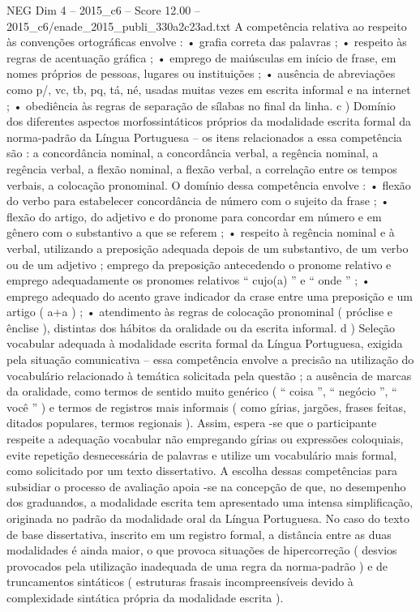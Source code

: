 \begin{textsample}{NEG Dim 4 – 2015\_c6 – Score 12.00 – 2015\_c6/enade\_2015\_publi\_330a2c23ad.txt}
A competência relativa ao respeito às convenções ortográficas envolve : • grafia correta das palavras ; • respeito às regras de acentuação gráfica ; • emprego de maiúsculas em início de frase, em nomes próprios de pessoas, lugares ou instituições ; • ausência de abreviações como p/, vc, tb, pq, tá, né, usadas muitas vezes em escrita informal e na internet ; • obediência às regras de separação de sílabas no final da linha. c ) Domínio dos diferentes aspectos morfossintáticos próprios da modalidade escrita formal da norma-padrão da Língua Portuguesa – os itens relacionados a essa competência são : a concordância nominal, a concordância verbal, a regência nominal, a regência verbal, a flexão nominal, a flexão verbal, a correlação entre os tempos verbais, a colocação pronominal.
O domínio dessa competência envolve : • flexão do verbo para estabelecer concordância de número com o sujeito da frase ; • flexão do artigo, do adjetivo e do pronome para concordar em número e em gênero com o substantivo a que se referem ; • respeito à regência nominal e à verbal, utilizando a preposição adequada depois de um substantivo, de um verbo ou de um adjetivo ; emprego da preposição antecedendo o pronome relativo e emprego adequadamente os pronomes relativos “ cujo(a) ” e “ onde ” ; • emprego adequado do acento grave indicador da crase entre uma preposição e um artigo ( a+a ) ; • atendimento às regras de colocação pronominal ( próclise e ênclise ), distintas dos hábitos da oralidade ou da escrita informal. d ) Seleção vocabular adequada à modalidade escrita formal da Língua Portuguesa, exigida pela situação comunicativa – essa competência envolve a precisão na utilização do vocabulário relacionado à temática solicitada pela questão ; a ausência de marcas da oralidade, como termos de sentido muito genérico ( “ coisa ”, “ negócio ”, “ você ” ) e termos de registros mais informais ( como gírias, jargões, frases feitas, ditados populares, termos regionais ).
Assim, espera -se que o participante respeite a adequação vocabular não empregando gírias ou expressões coloquiais, evite repetição desnecessária de palavras e utilize um vocabulário mais formal, como solicitado por um texto dissertativo.
A escolha dessas competências para subsidiar o processo de avaliação apoia -se na concepção de que, no desempenho dos graduandos, a modalidade escrita tem apresentado uma intensa simplificação, originada no padrão da modalidade oral da Língua Portuguesa.
No caso do texto de base dissertativa, inscrito em um registro formal, a distância entre as duas modalidades é ainda maior, o que provoca situações de hipercorreção ( desvios provocados pela utilização inadequada de uma regra da norma-padrão ) e de truncamentos sintáticos ( estruturas frasais incompreensíveis devido à complexidade sintática própria da modalidade escrita ).

\end{textsample}
